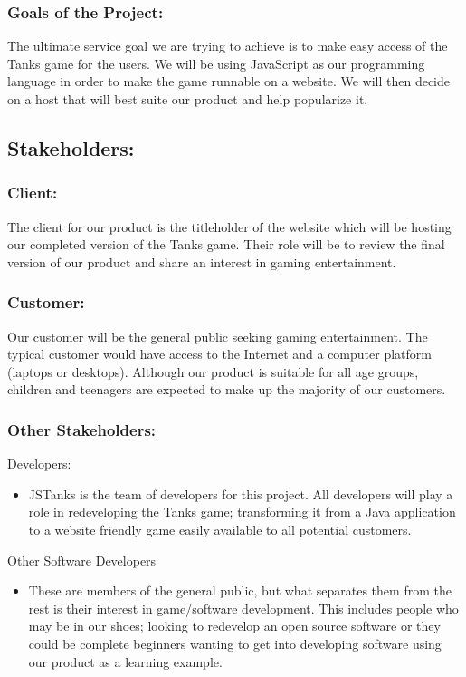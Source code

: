 \documentclass{article}
\begin{document}
\subsubsection{Goals of the Project:} The ultimate service goal we are trying to
achieve is to make easy access of the Tanks game for the users. We will be using
JavaScript as our programming language in order to make the game runnable on a
website. We will then decide on a host that will best suite our product and help
popularize it.

\subsection{Stakeholders:} 
\subsubsection{Client:} 
The client for our product is
the titleholder of the website which will be hosting our completed version of
the Tanks game. Their role will be to review the final version of our product
and share an interest in gaming entertainment.

\subsubsection{Customer:} Our customer will be the general public seeking gaming
entertainment. The typical customer would have access to the Internet and a
computer platform (laptops or desktops). Although our product is suitable for
all age groups, children and teenagers are expected to make up the majority of
our customers.

\subsubsection{Other Stakeholders:} 
Developers: 
\begin{itemize} 
\item JSTanks is
the team of developers for this project. All developers will play a role in
redeveloping the Tanks game; transforming it from a Java application to a
website friendly game easily available to all potential customers.
\end{itemize} Other Software Developers 
\begin{itemize} 
\item  These are members
of the general public, but what separates them from the rest is their interest
in game/software development. This includes people who may be in our shoes;
looking to redevelop an open source software or they could be complete beginners
wanting to get into developing software using our product as a learning example.
\end{itemize}
\end{document}
